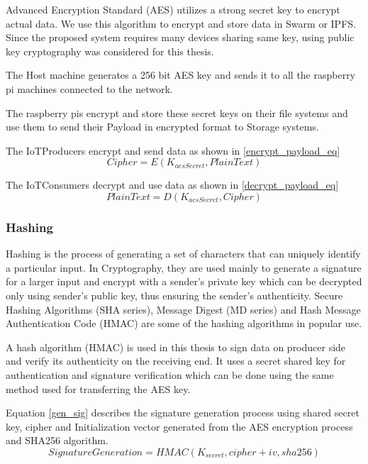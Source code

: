 \documentclass[11pt,openright]{report}
\begin{document}
Advanced Encryption Standard (AES) utilizes a strong secret key to encrypt actual data. We use this algorithm to encrypt and store data in Swarm or IPFS. Since the proposed system requires many devices sharing same key, using public key cryptography was considered for this thesis.

The Host machine generates a 256 bit AES key and sends it to all the raspberry pi machines connected to the network.

The raspberry pis encrypt and store these secret keys on their file systems and use them to send their Payload in encrypted format to Storage systems.

The IoTProducers encrypt and send data as shown in \ref{encrypt_payload_eq}
\begin{equation}\label{encrypt_payload_eq}
    Cipher = E(K_{aesSecret}, PlainText)
\end{equation}

The IoTConsumers decrypt and use data as shown in \ref{decrypt_payload_eq}
\begin{equation}\label{decrypt_payload_eq}
    PlainText = D(K_{aesSecret}, Cipher)
\end{equation}

\subsubsection{Hashing}
Hashing is the process of generating a set of characters that can uniquely identify a particular input. In Cryptography, they are used mainly to generate a signature for a larger input and encrypt with a sender's private key which can be decrypted only using sender's public key, thus ensuring the sender's authenticity. Secure Hashing Algorithms (SHA series), Message Digest (MD series) and Hash Message Authentication Code (HMAC) are some of the hashing algorithms in popular use.

A hash algorithm (HMAC) is used in this thesis to sign data on producer side and verify its authenticity on the receiving end. It uses a secret shared key for authentication and signature verification which can be done using the same method used for transferring the AES key. 

Equation \ref{gen_sig} describes the signature generation process using shared secret key, cipher and Initialization vector generated from the AES encryption process and SHA256 algorithm.
\begin{equation}\label{gen_sig}
    SignatureGeneration = HMAC(K_{secret}, cipher + iv, sha256)
\end{equation}
\end{document}
